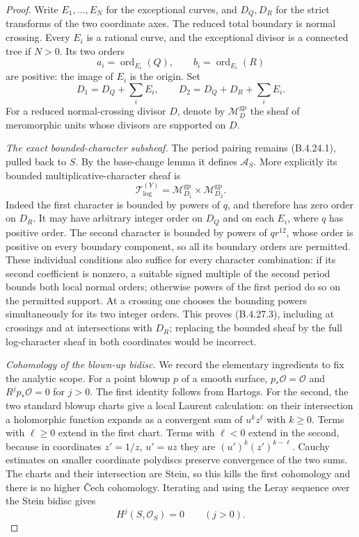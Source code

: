 \begin{proof}
Write $E_1,\ldots,E_N$ for the exceptional curves,
and $D_Q,D_R$ for the strict transforms of the
two coordinate axes. The reduced total boundary
is normal crossing. Every $E_i$ is a rational
curve, and the exceptional divisor is a connected
tree if $N>0$. Its two orders
\[
 a_i=\operatorname{ord}_{E_i}(Q),\qquad
 b_i=\operatorname{ord}_{E_i}(R)
 \tag{B.4.27.2}
\]
are positive: the image of $E_i$ is the origin.
Set
\[
 D_1=D_Q+\sum_i E_i,\qquad
 D_2=D_Q+D_R+\sum_i E_i.
\]
For a reduced normal-crossing divisor $D$, denote
by $\mathcal M_D^{\mathrm{gp}}$ the sheaf of
meromorphic units whose divisors are supported
on $D$.

\emph{The exact bounded-character subsheaf.}
The period pairing remains (B.4.24.1), pulled
back to $S$. By the base-change lemma
\citep[Lemma 1.2.9, pp.~80--81]{KKN2008Root}
it defines $\mathcal A_S$. More explicitly its
bounded multiplicative-character sheaf is
\[
 \mathcal T_{\log}^{(Y)}
   =\mathcal M_{D_1}^{\mathrm{gp}}
          \times\mathcal M_{D_2}^{\mathrm{gp}}.
 \tag{B.4.27.3}
\]
Indeed the first character is bounded by powers
of $q$, and therefore has zero order on $D_R$.
It may have arbitrary integer order on $D_Q$
and on each $E_i$, where $q$ has positive order.
The second character is bounded by powers of
$q r^{12}$, whose order is positive on every
boundary component, so all its boundary orders
are permitted. These individual conditions
also suffice for every character combination:
if its second coefficient is nonzero, a suitable
signed multiple of the second period bounds
both local normal orders; otherwise powers of
the first period do so on the permitted support.
At a crossing one chooses the bounding powers
simultaneously for its two integer orders.
This proves (B.4.27.3), including at crossings
and at intersections with $D_R$; replacing the
bounded sheaf by the full log-character sheaf
in both coordinates would be incorrect.

\emph{Cohomology of the blown-up bidisc.}
We record the elementary ingredients to fix
the analytic scope. For a point blowup $p$ of
a smooth surface,
$p_*\mathcal O=\mathcal O$ and
$R^j p_*\mathcal O=0$ for $j>0$.
The first identity follows from Hartogs.
For the second, the two standard blowup charts
give a local Laurent calculation: on their
intersection a holomorphic function expands
as a convergent sum of $u^k z^\ell$ with
$k\ge0$. Terms with $\ell\ge0$ extend in
the first chart. Terms with $\ell<0$ extend
in the second, because in coordinates
$z'=1/z$, $u'=uz$ they are
$(u')^k(z')^{k-\ell}$. Cauchy estimates on
smaller coordinate polydiscs preserve convergence
of the two sums. The charts and their
intersection are Stein, so this kills the
first cohomology and there is no higher
\v Cech cohomology. Iterating and using the
Leray sequence over the Stein bidisc gives
\[
 H^j(S,\mathcal O_S)=0\qquad(j>0).
 \tag{B.4.27.4}
\]


\end{proof}
